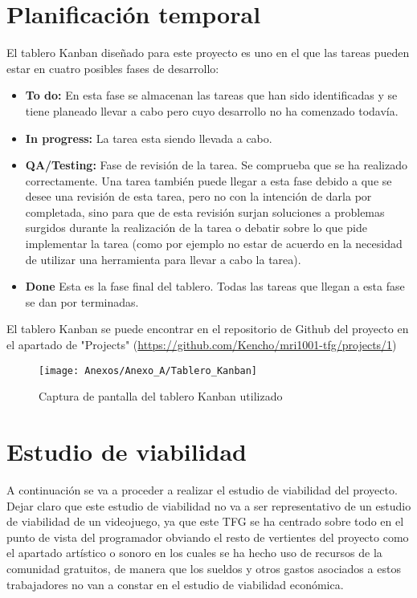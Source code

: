 \section{Planificación temporal}
El tablero Kanban diseñado para este proyecto es uno en el que las tareas pueden estar en cuatro posibles fases de desarrollo:
\begin{itemize}
\item
\textbf{To do:} En esta fase se almacenan las tareas que han sido identificadas y se tiene planeado llevar a cabo pero cuyo desarrollo no ha comenzado todavía.
\item
\textbf{In progress:} La tarea esta siendo llevada a cabo.
\item
\textbf{QA/Testing:} Fase de revisión de la tarea. Se comprueba que se ha realizado correctamente. Una tarea también puede llegar a esta fase debido a que se desee una revisión de esta tarea, pero no con la intención de darla por completada, sino para que de esta revisión surjan soluciones a problemas surgidos durante la realización de la tarea o debatir sobre lo que pide implementar la tarea (como por ejemplo no estar de acuerdo en la necesidad de utilizar una herramienta para llevar a cabo la tarea).
\item
\textbf{Done} Esta es la fase final del tablero. Todas las tareas que llegan a esta fase se dan por terminadas.
\end{itemize} 

El tablero Kanban se puede encontrar en el repositorio de Github del proyecto en el apartado de "Projects" (\url{https://github.com/Kencho/mri1001-tfg/projects/1})

\clearpage
\begin{figure}[h]
\centering
\texttt{[image: Anexos/Anexo\_A/Tablero\_Kanban]}
\caption{Captura de pantalla del tablero Kanban utilizado}
\end{figure}

\section{Estudio de viabilidad}
A continuación se va a proceder a realizar el estudio de viabilidad del proyecto. Dejar claro que este estudio de viabilidad no va a ser representativo de un estudio de viabilidad de un videojuego, ya que este TFG se ha centrado sobre todo en el punto de vista del programador obviando el resto de vertientes del proyecto como el apartado artístico o sonoro en los cuales se ha hecho uso de recursos de la comunidad gratuitos, de manera que los sueldos y otros gastos asociados a estos trabajadores no van a constar en el estudio de viabilidad económica.

